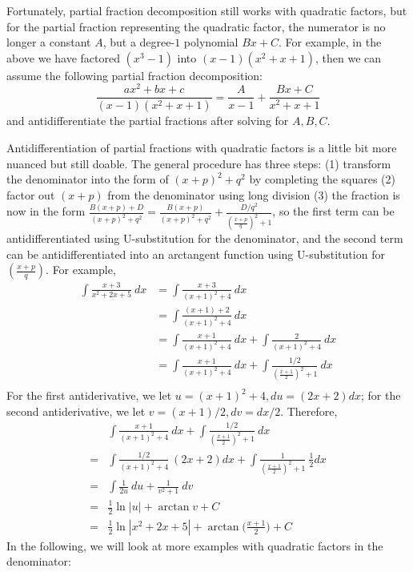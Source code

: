Fortunately, partial fraction decomposition still works with quadratic factors, but for the partial fraction representing the quadratic factor, the numerator is no longer a constant $A$, but a degree-$1$ polynomial $B x + C$.  For example, in the above we have factored $(x^3-1)$ into $(x-1)(x^2+x+1)$, then we can assume the following partial fraction decomposition:
\[\frac{ax^2+bx+c}{(x-1)(x^2+x+1)} = \frac{A}{x-1} + \frac{Bx + C}{x^2+x+1}\]
and antidifferentiate the partial fractions after solving for $A, B, C$.  

Antidifferentiation of partial fractions with quadratic factors is a little bit more nuanced but still doable.  The general procedure has three steps: (1) transform the denominator into the form of $(x+p)^2+q^2$ by completing the squares (2) factor out $(x+p)$ from the denominator using long division (3) the fraction is now in the form $\frac{B(x+p)+D}{(x+p)^2+q^2} = \frac{B(x+p)}{(x+p)^2+q^2} + \frac{D/q^2}{(\frac{x+p}{q})^2+1}$, so the first term can be antidifferentiated using U-substitution for the denominator, and the second term can be antidifferentiated into an arctangent function using U-substitution for $(\frac{x+p}{q})$.  For example, 
\begin{align*}
    \int \frac{x+3}{x^2+2x+5}~dx &= \int \frac{x+3}{(x+1)^2 + 4}~dx\\
    &= \int \frac{(x+1)+2}{(x+1)^2 + 4}~dx\\
    &= \int \frac{x+1}{(x+1)^2 + 4}~dx + \int \frac{2}{(x+1)^2 + 4}~dx\\
    &= \int \frac{x+1}{(x+1)^2 + 4}~dx + \int \frac{1/2}{(\frac{x+1}{2})^2 + 1}~dx\\
\end{align*}
For the first antiderivative, we let $u = (x+1)^2+4, du = (2x+2)dx$; for the second antiderivative, we let $v = (x+1)/2, dv = dx/2$.  Therefore,
\begin{align*}
    &\int \frac{x+1}{(x+1)^2 + 4}~dx + \int \frac{1/2}{(\frac{x+1}{2})^2 + 1}~dx\\
    =& \int \frac{1/2}{(x+1)^2 + 4}~(2x+2)dx + \int \frac{1}{(\frac{x+1}{2})^2 + 1}~\frac{1}{2}dx\\
    =& \int \frac{1}{2u}~du + \frac{1}{v^2+1}~dv\\
    =& \frac{1}{2}\ln |u| + \arctan v + C\\
    =& \frac{1}{2}\ln |x^2+2x+5| + \arctan \Big(\frac{x+1}{2}\Big) + C
\end{align*}
In the following, we will look at more examples with quadratic factors in the denominator:

